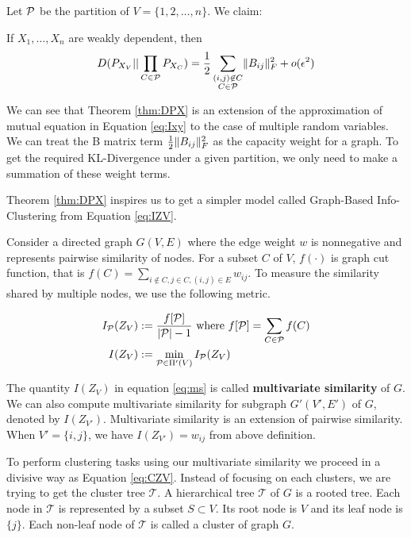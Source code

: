 Let $\P$ be the partition of $V=\{1,2,\dots, n\}$. We claim:
\begin{theorem}\label{thm:DPX}
If $X_1, \dots, X_n$ are weakly dependent, then
\begin{equation}
D(P_{X_V} || \prod_{C\in \P} P_{X_{C}}) = {1 \over 2}\sum_{\substack{(i,j) \not\in C\\ C\in \P}} \norm{B_{ij}}_F^2 + o(\epsilon^2)
\end{equation}
\end{theorem}
We can see that Theorem \ref{thm:DPX} is an extension of the approximation of mutual equation in Equation \eqref{eq:Ixy} to the case of multiple random variables. We can treat the B matrix term ${1 \over 2} \norm{B_{ij}}_F^2$
as the capacity weight for a graph. To get the required KL-Divergence under a given partition, we only need to make a
summation of these weight terms.

Theorem \ref{thm:DPX} inspires us to get a simpler model
called Graph-Based Info-Clustering from
Equation \eqref{eq:IZV}.

Consider a directed graph
$G(V, E)$ where the edge weight $w$ is nonnegative and represents pairwise similarity of nodes. For a subset $C$ of $V$, $f(\cdot)$ is graph cut function, that is $f(C) = \sum_{i\not\in C, j\in C, (i,j) \in E} w_{ij}$. To measure the similarity shared by multiple nodes, we use the following metric.
\begin{definition}\label{def:ms}
\begin{align}
I_{\P}(Z_V) & := \frac{ f[\P] }{  \abs{\mathcal{P}} - 1 } \textrm{ where } f[\P] = \sum_{C\in \P}f(C)\\
I(Z_V) & := \min_{\mathcal{P} \in \Pi'(V)} I_{\mathcal{P}}(Z_V)  \label{eq:ms}
\end{align}
\end{definition}
The quantity $I(Z_V)$ in equation \eqref{eq:ms} is called \textbf{multivariate similarity} of $G$. We can also compute multivariate similarity for subgraph $G'(V',E')$ of $G$, denoted by $I(Z_{V'})$. Multivariate similarity is an extension of pairwise similarity. When $V'=\{i,j\}$, we have $I(Z_{V'})=w_{ij}$ from above definition.

To perform clustering tasks using our multivariate similarity we proceed in a divisive way as Equation \eqref{eq:CZV}. Instead of focusing on each clusters, we are trying to get the cluster tree $\mathcal{T}$. A hierarchical tree $\mathcal{T}$ of $G$ is a rooted tree. Each node in $\mathcal{T}$ is represented by a subset $S \subset V$. Its root node is $V$ and its leaf node is $\{j\}$. Each non-leaf node of $\mathcal{T}$ is called a cluster of graph $G$.

